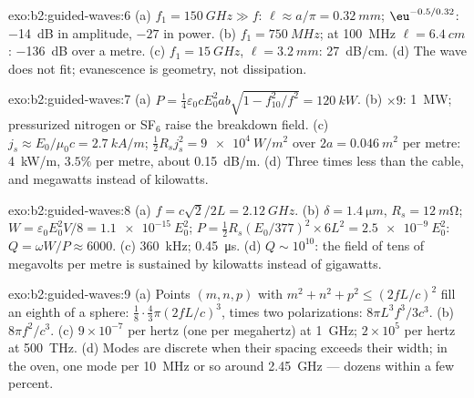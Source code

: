 \begin{solution}{exo:b2:guided-waves:6}
(a) $f_1 = \qty{150}{GHz} \gg f$: $\ell \approx a/\pi = \qty{0.32}{mm}$; $\eu^{-0.5/0.32}$:
\qty{-14}{dB} in amplitude, $-27$ in power. (b) $f_1 = \qty{750}{MHz}$; at \qty{100}{MHz}
$\ell = \qty{6.4}{cm}$: \qty{-136}{dB} over a metre. (c) $f_1 = \qty{15}{GHz}$, $\ell =
\qty{3.2}{mm}$: \qty{27}{dB/cm}. (d) The wave does not fit; evanescence is
geometry, not dissipation.
\end{solution}

\begin{solution}{exo:b2:guided-waves:7}
(a) $P = \tfrac14\varepsilon_0cE_0^2ab\sqrt{1 - f_{10}^2/f^2} = \qty{120}{kW}$. (b) $\times9$:
\qty{1}{MW}; pressurized nitrogen or SF$_6$ raise the breakdown field. (c)
$j_s \approx E_0/\mu_0c = \qty{2.7}{kA/m}$; $\tfrac12R_sj_s^2 = \qty{9e4}{W/m^2}$ over $2a =
\qty{0.046}{m^2}$ per metre: \qty{4}{kW/m}, $3.5\%$ per metre, about \qty{0.15}{dB/m}.
(d) Three times less than the cable, and megawatts instead of
kilowatts.
\end{solution}

\begin{solution}{exo:b2:guided-waves:8}
(a) $f = c\sqrt2/2L = \qty{2.12}{GHz}$. (b) $\delta = \qty{1.4}{\micro m}$, $R_s = \qty{12}{m\ohm}$;
$W = \varepsilon_0E_0^2V/8 = \qty{1.1e-15}{}E_0^2$; $P = \tfrac12R_s(E_0/377)^2 \times 6L^2 =
\qty{2.5e-9}{}E_0^2$: $Q = \omega W/P \approx 6000$. (c) \qty{360}{kHz}; \qty{0.45}{\micro s}. (d)
$Q \sim 10^{10}$: the field of tens of megavolts per metre is sustained by
kilowatts instead of gigawatts.
\end{solution}

\begin{solution}{exo:b2:guided-waves:9}
(a) Points $(m, n, p)$ with $m^2 + n^2 + p^2 \le (2fL/c)^2$ fill an eighth
of a sphere: $\tfrac18\cdot\tfrac43\pi(2fL/c)^3$, times two polarizations:
$8\pi L^3f^3/3c^3$. (b) $8\pi f^2/c^3$. (c) $9 \times 10^{-7}$ per hertz (one per
megahertz) at \qty{1}{GHz}; $2 \times 10^5$ per hertz at \qty{500}{THz}. (d) Modes are
discrete when their spacing exceeds their width; in the oven, one mode
per \qty{10}{MHz} or so around \qty{2.45}{GHz} --- dozens within a few
percent.
\end{solution}

